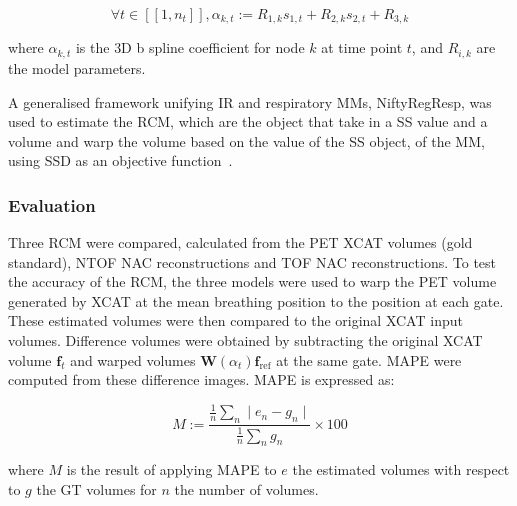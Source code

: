                 \begin{equation}  \label{eq:b_spline_coefficients}
                    \forall t \in [[1,n_t]], \alpha_{k,t} := R_{1,k} s_{1,t} + R_{2,k} s_{2,t} + R_{3,k}
                \end{equation}
                
                \noindent where $\alpha_{k,t}$ is the \gls{3D} b spline coefficient for node $k$ at time point $t$, and $R_{i,k}$ are the model parameters.
            
                A generalised framework unifying \gls{IR} and respiratory \gls{MM}s, NiftyRegResp, was used to estimate the \gls{RCM}, which are the object that take in a \gls{SS} value and a volume and warp the volume based on the value of the \gls{SS} object, of the \gls{MM}, using \gls{SSD} as an objective function~.
                
            \subsubsection{Evaluation} \label{sec:impact_of_tof_on_respiratory_motion_modelling_using_nac_pet_methods_evaluation}
                Three \gls{RCM} were compared, calculated from the \gls{PET} \gls{XCAT} volumes (gold standard), \gls{NTOF} \gls{NAC} reconstructions and \gls{TOF} \gls{NAC} reconstructions. To test the accuracy of the \gls{RCM}, the three models were used to warp the \gls{PET} volume generated by \gls{XCAT} at the mean breathing position to the position at each gate. These estimated volumes were then compared to the original \gls{XCAT} input volumes. Difference volumes were obtained by subtracting the original \gls{XCAT} volume $\mathbf{f}_t$ and warped volumes $\mathbf{W}(\alpha_t) \mathbf{f}_\mathrm{ref}$ at the same gate. \gls{MAPE} were computed from these difference images. \gls{MAPE} is expressed as:
                
                \begin{equation}  \label{eq:mape}
                   M := \frac{\frac{1}{n}\sum_{n}\mid e_n - g_n \mid}{\frac{1}{n}\sum_{n}g_n} \times 100
                \end{equation}
                
                \noindent where $M$ is the result of applying \gls{MAPE} to $e$ the estimated volumes with respect to $g$ the \gls{GT} volumes for $n$ the number of volumes.
                
